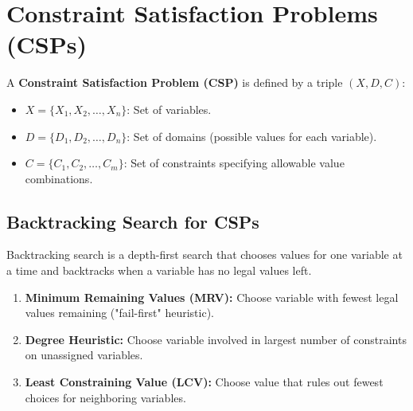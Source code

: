 \documentclass[12pt,a4paper]{article}
\begin{document}
\section{Constraint Satisfaction Problems (CSPs)}

\begin{tcolorbox}[defbox, title={Definition of a CSP}]
  A \textbf{Constraint Satisfaction Problem (CSP)} is defined by a triple $(X, D, C)$:
  \begin{itemize}[leftmargin=*, noitemsep]
    \item $X = \{X_1, X_2, \dots, X_n\}$: Set of variables.
    \item $D = \{D_1, D_2, \dots, D_n\}$: Set of domains (possible values for each variable).
    \item $C = \{C_1, C_2, \dots, C_m\}$: Set of constraints specifying allowable value combinations.
  \end{itemize}
\end{tcolorbox}

\begin{tcolorbox}[tikzbox, title={Constraint Graph Representation (Map Coloring Example)}]
\centering
{}
\end{tcolorbox}

\subsection{Backtracking Search for CSPs}
Backtracking search is a depth-first search that chooses values for one variable at a time and backtracks when a variable has no legal values left.

\begin{tcolorbox}[examplebox, title={Heuristics for CSP Backtracking}]
  \begin{enumerate}[leftmargin=*, noitemsep]
    \item \textbf{Minimum Remaining Values (MRV):} Choose variable with fewest legal values remaining ("fail-first" heuristic).
    \item \textbf{Degree Heuristic:} Choose variable involved in largest number of constraints on unassigned variables.
    \item \textbf{Least Constraining Value (LCV):} Choose value that rules out fewest choices for neighboring variables.
  \end{enumerate}
\end{tcolorbox}
\end{document}
